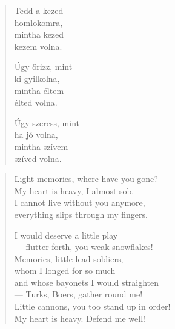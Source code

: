 \documentclass[11pt]{book}
\newcommand*{\centeredornament}{\centerline{\pgfornament[width=6cm]{88}}}
\begin{document}
\vspace*{-15mm}
\centeredornament



\begin{verse}
  Tedd a kezed \\
  homlokomra, \\
  mintha kezed \\
  kezem volna.

  Úgy őrizz, mint \\
  ki gyilkolna, \\
  mintha éltem \\
  élted volna.

  Úgy szeress, mint \\
  ha jó volna, \\
  mintha szívem \\
  szíved volna.
\end{verse}

\newpage

\vspace*{-15mm}
\centeredornament




\begin{verse}
  Light memories, where have you gone? \\
  My heart is heavy, I almost sob. \\
  I cannot live without you anymore, \\
  everything slips through my fingers.

  I would deserve a little play \\
  --- flutter forth, you weak snowflakes! \\
  Memories, little lead soldiers, \\
  whom I longed for so much \\
  and whose bayonets I would straighten \\
  --- Turks, Boers, gather round me! \\
  Little cannons, you too stand up in order! \\
  My heart is heavy. Defend me well!
\end{verse}

\newpage
\end{document}
